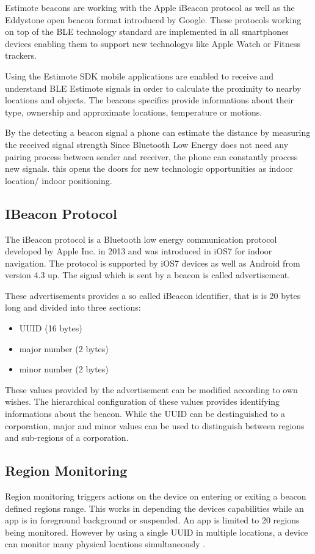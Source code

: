 Estimote beacons are working with the Apple iBeacon protocol as well as the Eddystone  open beacon format introduced by Google. These protocols working on top of the BLE technology standard are implemented in all smartphones devices enabling them to support new technologys like Apple Watch or Fitness trackers.

Using the Estimote SDK \cite{developerDocsEstimote} mobile applications are enabled to receive and understand BLE Estimote signals in order to calculate the proximity to nearby locations and objects. The beacons specifics provide informations about their type, ownership and approximate locations, temperature or motions.

By the detecting a beacon signal a phone can estimate the distance by measuring the received signal strength \cite{developerDocsEstimote} Since Bluetooth Low Energy does not need any pairing process between sender and receiver, the phone can constantly process new signals. this opens the doors for new technologic opportunities as indoor location/ indoor positioning.

\subsection{IBeacon Protocol}
The iBeacon protocol is a Bluetooth low energy communication protocol developed by Apple Inc. in 2013 and was introduced in iOS7 for indoor navigation. The protocol is supported by iOS7 devices as well as Android from version 4.3 up. The signal which is sent by a beacon is called advertisement. 

These advertisements provides a so called iBeacon identifier, that is is 20 bytes long and divided into three sections:

\begin{itemize}
\item UUID (16 bytes)
\item major number (2 bytes)
\item minor number (2 bytes)
\end{itemize}


These values provided by the advertisement can be modified according to own wishes.
The hierarchical configuration of these values provides identifying informations about the beacon. While the UUID can be destinguished to a corporation, major and minor values can be used to distinguish between regions and sub-regions of a corporation.

\subsection{Region Monitoring}
Region monitoring triggers actions on the device on entering or exiting a beacon defined regions range. This works in depending the devices capabilities while an app is in foreground background or suspended. An app is limited to 20 regions being monitored. However by using a single UUID in multiple locations, a device can monitor many physical locations simultaneously \cite{appleIBeacon}.

